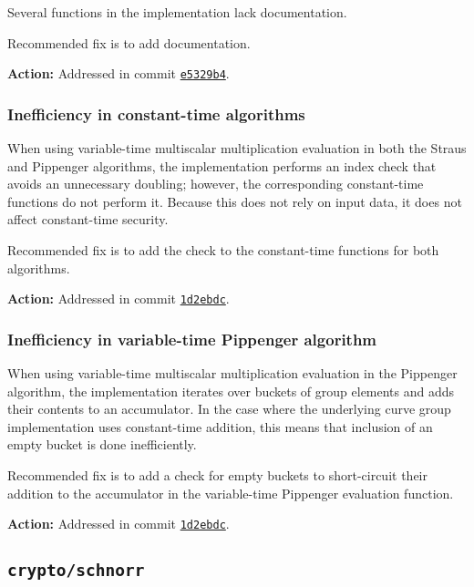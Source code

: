 \documentclass{article}
\begin{document}
Several functions in the implementation lack documentation.

Recommended fix is to add documentation.

\textbf{Action:} Addressed in commit \href{https://github.com/serai-dex/serai/commit/e5329b42e6122fb6f2ebe5c97e94107daa34f798}{\texttt{e5329b4}}.


\subsubsection{Inefficiency in constant-time algorithms}

When using variable-time multiscalar multiplication evaluation in both the Straus and Pippenger algorithms, the implementation performs an index check that avoids an unnecessary doubling; however, the corresponding constant-time functions do not perform it.
Because this does not rely on input data, it does not affect constant-time security.

Recommended fix is to add the check to the constant-time functions for both algorithms.

\textbf{Action:} Addressed in commit \href{https://github.com/serai-dex/serai/commit/1d2ebdca62148a690d7e7a8c90daf2838f0267ab}{\texttt{1d2ebdc}}.


\subsubsection{Inefficiency in variable-time Pippenger algorithm}

When using variable-time multiscalar multiplication evaluation in the Pippenger algorithm, the implementation iterates over 
buckets of group elements and adds their contents to an accumulator.
In the case where the underlying curve group implementation uses constant-time addition, this means that inclusion of an empty bucket is done inefficiently.

Recommended fix is to add a check for empty buckets to short-circuit their addition to the accumulator in the variable-time Pippenger evaluation function.

\textbf{Action:} Addressed in commit \href{https://github.com/serai-dex/serai/commit/1d2ebdca62148a690d7e7a8c90daf2838f0267ab}{\texttt{1d2ebdc}}.


\subsection{\texttt{crypto/schnorr}}
\end{document}
